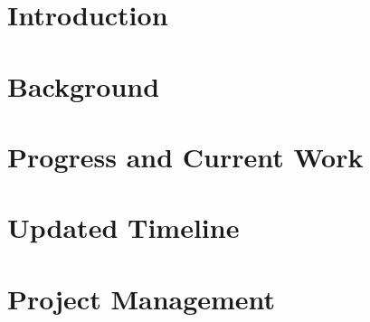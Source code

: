 \documentclass[a4paper,fleqn,10pt]{article}
\begin{document}


\pagestyle{plain}

\section{Introduction}


\section{Background}


\section{Progress and Current Work}


\section{Updated Timeline}


\section{Project Management}


% 


\end{document}
